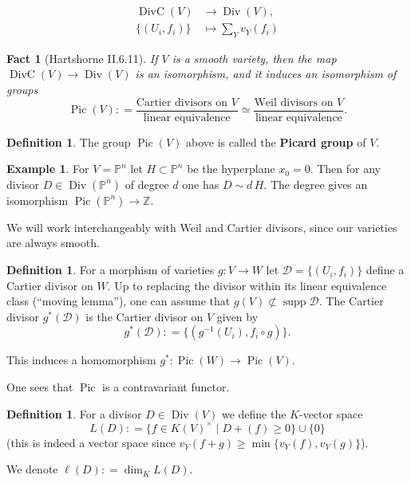 \documentclass{article}
\newtheorem{fact}[proposition]{Fact}
\theoremstyle{definition}
\newtheorem{example}[proposition]{Example}
\newtheorem{definition}[proposition]{Definition}
\DeclareMathOperator{\supp}{supp}
\DeclareMathOperator{\Div}{Div}
\DeclareMathOperator{\DivC}{DivC}
\DeclareMathOperator{\Pic}{Pic}
\newcommand{\isom}{\simeq}
\newcommand{\term}{\textbf}
\newcommand{\dfn}{\mathrel{\mathop:}=}
\newcommand{\ZZ}{\mathbb{Z}}
\newcommand{\PP}{\mathbb{P}}
\begin{document}
\begin{align*}
  \DivC (V) & \to \Div (V),\\
  \{ (U_i,f_i) \} & \mapsto \sum_Y v_Y (f_i)
\end{align*}

\begin{fact}[Hartshorne II.6.11]
  If $V$ is a smooth variety, then the map $\DivC (V) \to \Div (V)$ is an
  isomorphism, and it induces an isomorphism of groups
  \[ \Pic (V) \dfn \frac{\text{Cartier divisors on }V}{\text{linear equivalence}} \isom
    \frac{\text{Weil divisors on }V}{\text{linear equivalence}}. \]
\end{fact}

\begin{definition}
  The group $\Pic (V)$ above is called the \term{Picard group} of $V$.
\end{definition}

\begin{example}
  For $V = \PP^n$ let $H \subset \PP^n$ be the hyperplane $x_0 = 0$. Then for
  any divisor $D \in \Div (\PP^n)$ of degree $d$ one has $D \sim d\,H$. The
  degree gives an isomorphism $\Pic (\PP^n) \to \ZZ$.
\end{example}

We will work interchangeably with Weil and Cartier divisors, since our varieties
are always smooth.

\begin{definition}
  For a morphism of varieties $g\colon V \to W$ let
  $\mathcal{D} = \{ (U_i,f_i) \}$ define a Cartier divisor on $W$. Up to
  replacing the divisor within its linear equivalence class (``moving lemma''),
  one can assume that $g (V) \not\subset \supp \mathcal{D}$. The Cartier divisor
  $g^* (\mathcal{D})$ is the Cartier divisor on $V$ given by
  $$g^* (\mathcal{D}) \dfn \{ (g^{-1} (U_i), f_i\circ g) \}.$$

  This induces a homomorphism $g^*\colon \Pic (W) \to \Pic (V)$.
\end{definition}

One sees that $\Pic$ is a contravariant functor.

\begin{definition}
  For a divisor $D \in \Div (V)$ we define the $K$-vector space
  $$L (D) \dfn \{ f\in K(V)^\times \mid D + (f) \ge 0 \} \cup \{ 0 \}$$
  (this is indeed a vector space since $v_Y (f+g) \ge \min \{ v_Y (f), v_Y (g) \}$).

  We denote $\ell (D) \dfn \dim_K L (D)$.
\end{definition}
\end{document}
